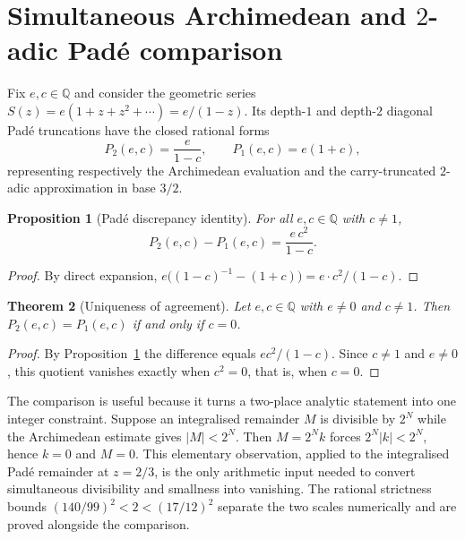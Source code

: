 \documentclass[11pt,a4paper]{article}
\newtheorem{theorem}{Theorem}[section]
\newtheorem{proposition}[theorem]{Proposition}
\theoremstyle{remark}
\newcommand{\Q}{\mathbb{Q}}
\begin{document}
\section{Simultaneous Archimedean and \texorpdfstring{$2$}{2}-adic Pad\'e comparison}
\label{sec:pade}

Fix $e, c \in \Q$ and consider the geometric series $S(z) = e(1 + z + z^{2} + \cdots) = e/(1-z)$. Its depth-$1$ and depth-$2$ diagonal Pad\'e truncations have the closed rational forms
\begin{equation}
  P_{2}(e,c) = \frac{e}{1-c}, \qquad P_{1}(e,c) = e(1+c),
\end{equation}
representing respectively the Archimedean evaluation and the carry-truncated $2$-adic approximation in base $3/2$.

\begin{proposition}[Pad\'e discrepancy identity]
\label{prop:identity}
For all $e, c \in \Q$ with $c \neq 1$,
\begin{equation}
  P_{2}(e,c) - P_{1}(e,c) = \frac{e\,c^{2}}{1-c}.
\end{equation}
\end{proposition}

\begin{proof}
By direct expansion, $e\bigl((1-c)^{-1} - (1+c)\bigr) = e \cdot c^{2}/(1-c)$.
\end{proof}

\begin{theorem}[Uniqueness of agreement]
\label{thm:iff}
Let $e, c \in \Q$ with $e \neq 0$ and $c \neq 1$. Then $P_{2}(e,c) = P_{1}(e,c)$ if and only if $c = 0$.
\end{theorem}

\begin{proof}
By Proposition~\ref{prop:identity} the difference equals $e c^{2}/(1-c)$. Since $c \neq 1$ and $e \neq 0$, this quotient vanishes exactly when $c^{2} = 0$, that is, when $c = 0$.
\end{proof}

The comparison is useful because it turns a two-place analytic statement into one integer constraint. Suppose an integralised remainder $M$ is divisible by $2^{N}$ while the Archimedean estimate gives $|M| < 2^{N}$. Then $M = 2^{N} k$ forces $2^{N}|k| < 2^{N}$, hence $k = 0$ and $M = 0$. This elementary observation, applied to the integralised Pad\'e remainder at $z = 2/3$, is the only arithmetic input needed to convert simultaneous divisibility and smallness into vanishing. The rational strictness bounds $(140/99)^{2} < 2 < (17/12)^{2}$ separate the two scales numerically and are proved alongside the comparison.
\end{document}

